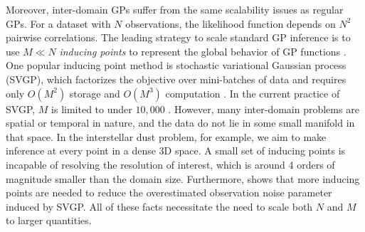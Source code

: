 Moreover, inter-domain GPs suffer from the
same scalability issues as regular GPs.
For a dataset with $N$ observations,
the likelihood function depends on $N^2$ pairwise correlations.
The leading strategy to scale standard GP inference is to use $M \ll N$ \emph{inducing points}
to represent the global behavior of GP functions \citep{rasmussen2006gaussian}.
One popular inducing point method is stochastic variational Gaussian process (SVGP),
which factorizes the objective over mini-batches of data
and requires only $O(M^2)$ storage and $O(M^3)$ computation \citep{hensman2013gaussian}.
In the current practice of SVGP, $M$ is limited to under $10{,}000$ \citep{wilson2015kernel, izmailov2018scalable}.
However, many inter-domain problems are spatial or temporal in nature,
and the data do not lie in some small manifold in that space.
In the interstellar dust problem, for example, we aim to make inference at
every point in a dense 3D space.
A small set of inducing points
is incapable of resolving the resolution of interest,
which is around 4 orders of magnitude smaller than the domain size.
Furthermore, \citet{bauer2016understanding} shows that more inducing points are needed
to reduce the overestimated observation noise parameter induced by SVGP.
All of these facts necessitate the need to scale both $N$ and $M$ to larger quantities.

